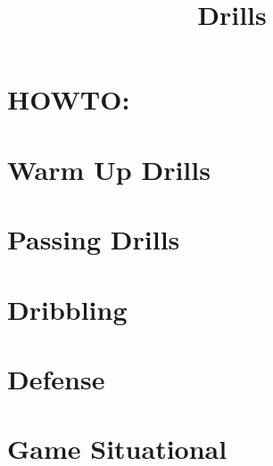 \documentclass[10pt,letterpaper]{article}
\title{Drills}
\author{}
\date{}
\begin{document}
\selectfont
\maketitle

\section{HOWTO:}


\section{Warm Up Drills}

\section{Passing Drills}

















\section{Dribbling}




\section{Defense}








\section{Game Situational}

\end{document}
